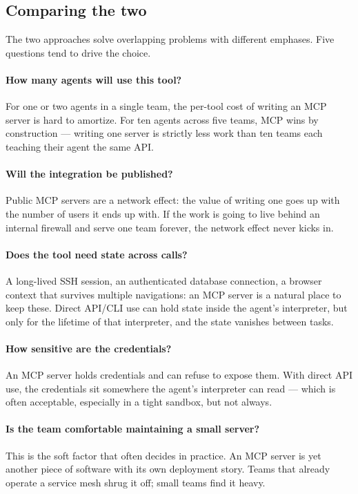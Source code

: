 \subsection{Comparing the two}
\label{sec:mcp-compare}

The two approaches solve overlapping problems with different
emphases. Five questions tend to drive the choice.

\paragraph{How many agents will use this tool?}
For one or two agents in a single team, the per-tool cost of
writing an MCP server is hard to amortize. For ten agents across
five teams, MCP wins by construction --- writing one server is
strictly less work than ten teams each teaching their agent the
same API.

\paragraph{Will the integration be published?}
Public MCP servers are a network effect: the value of writing one
goes up with the number of users it ends up with. If the work is
going to live behind an internal firewall and serve one team
forever, the network effect never kicks in.

\paragraph{Does the tool need state across calls?}
A long-lived SSH session, an authenticated database connection, a
browser context that survives multiple navigations: an MCP server
is a natural place to keep these. Direct API/CLI use can hold
state inside the agent's interpreter, but only for the lifetime of
that interpreter, and the state vanishes between tasks.

\paragraph{How sensitive are the credentials?}
An MCP server holds credentials and can refuse to expose them. With
direct API use, the credentials sit somewhere the agent's
interpreter can read --- which is often acceptable, especially in
a tight sandbox, but not always.

\paragraph{Is the team comfortable maintaining a small server?}
This is the soft factor that often decides in practice. An MCP
server is yet another piece of software with its own deployment
story. Teams that already operate a service mesh shrug it off;
small teams find it heavy.

